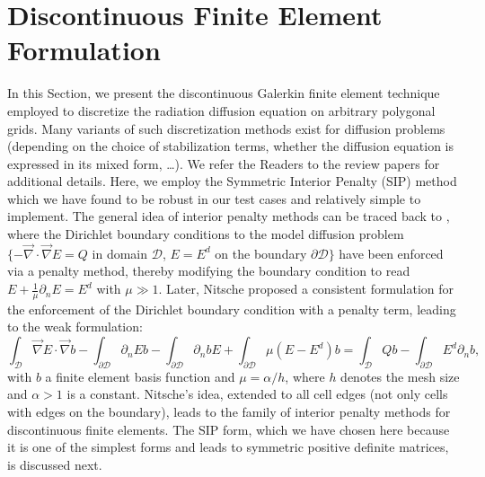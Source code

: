 \documentclass[preprint,10pt]{elsarticle}
\renewcommand{\div}{\vec{\nabla}\! \cdot \!}
\newcommand{\grad}{\vec{\nabla}}
\newcommand{\D}{\mathcal{D}}
\newcommand{\tf}{b}
\begin{document}
\section{Discontinuous Finite Element Formulation} \label{sec:ip}

In this Section, we present the discontinuous Galerkin finite element technique employed to
discretize the radiation diffusion equation on arbitrary polygonal grids. Many variants of such discretization
methods exist for diffusion problems (depending on the choice of stabilization terms, whether 
the diffusion equation is expressed in its mixed form, \ldots). We refer the Readers to the review
papers \cite{unification,brezzi etc} for additional details. Here, we employ the Symmetric
Interior Penalty (SIP) method which we have found to be robust in our test cases and relatively simple 
to implement.
The general idea of interior penalty methods can be traced back to \cite{lions1968}, where the Dirichlet
boundary conditions to the model diffusion problem $\{-\div \grad E = Q$ in domain $\D$, $E=E^d$ on 
the boundary $\partial \D\}$ have been enforced via a penalty method, thereby modifying the 
boundary condition to read $E+\frac{1}{\mu}\partial_n E = E^d$ with $\mu\gg 1$. Later, 
Nitsche \cite{nitsche1971} proposed a consistent formulation for the enforcement of the 
Dirichlet boundary condition with a penalty term, leading to the weak formulation:
\begin{equation}
\label{eq:penalty_nitsche_bd_only}
\int_{\D} \grad E \cdot \grad \tf
- \int_{\partial\D} \partial_n E \tf  
- \int_{\partial\D} \partial_n \tf E 
+ \int_{\partial\D} \mu(E-E^d) \tf 
=
\int_{\D} Q \tf 
- \int_{\partial\D} E^d \partial_n \tf ,
\end{equation}
with $\tf$ a finite element basis function and $\mu=\alpha/h$, where $h$ denotes 
the mesh size and $\alpha>1$ is a constant.
%
Nitsche's idea, extended to all cell edges (not only cells with edges on the boundary), leads
to the family of interior penalty methods for discontinuous finite elements. The SIP form,
which we have chosen here because it is one of the simplest forms and leads to symmetric 
positive definite matrices, is discussed next. 
\end{document}

